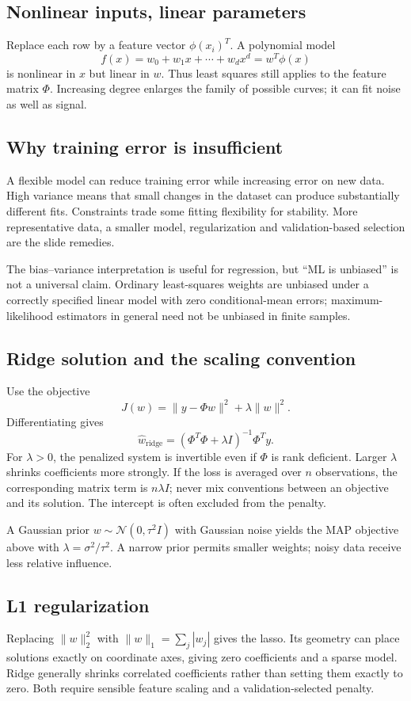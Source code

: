 \documentclass[11pt]{article}
\begin{document}
\subsection{Nonlinear inputs, linear parameters}
Replace each row by a feature vector $\phi(x_i)^T$. A polynomial model
\[
f(x)=w_0+w_1x+\cdots+w_dx^d=w^T\phi(x)
\]
is nonlinear in $x$ but linear in $w$. Thus least squares still applies to the feature matrix $\Phi$. Increasing degree enlarges the family of possible curves; it can fit noise as well as signal.
\subsection{Why training error is insufficient}
A flexible model can reduce training error while increasing error on new data. High variance means that small changes in the dataset can produce substantially different fits. Constraints trade some fitting flexibility for stability. More representative data, a smaller model, regularization and validation-based selection are the slide remedies.

The bias--variance interpretation is useful for regression, but ``ML is unbiased'' is not a universal claim. Ordinary least-squares weights are unbiased under a correctly specified linear model with zero conditional-mean errors; maximum-likelihood estimators in general need not be unbiased in finite samples.
\subsection{Ridge solution and the scaling convention}
Use the objective
\[
J(w)=\|y-\Phi w\|^2+\lambda\|w\|^2.
\]
Differentiating gives
\[
\boxed{\hat w_{\mathrm{ridge}}=(\Phi^T\Phi+\lambda I)^{-1}\Phi^Ty}.
\]
For $\lambda>0$, the penalized system is invertible even if $\Phi$ is rank deficient. Larger $\lambda$ shrinks coefficients more strongly. If the loss is averaged over $n$ observations, the corresponding matrix term is $n\lambda I$; never mix conventions between an objective and its solution. The intercept is often excluded from the penalty.

A Gaussian prior $w\sim\mathcal N(0,\tau^2I)$ with Gaussian noise yields the MAP objective above with $\lambda=\sigma^2/\tau^2$. A narrow prior permits smaller weights; noisy data receive less relative influence.
\subsection{L1 regularization}
Replacing $\|w\|_2^2$ with $\|w\|_1=\sum_j|w_j|$ gives the lasso. Its geometry can place solutions exactly on coordinate axes, giving zero coefficients and a sparse model. Ridge generally shrinks correlated coefficients rather than setting them exactly to zero. Both require sensible feature scaling and a validation-selected penalty.
\end{document}
